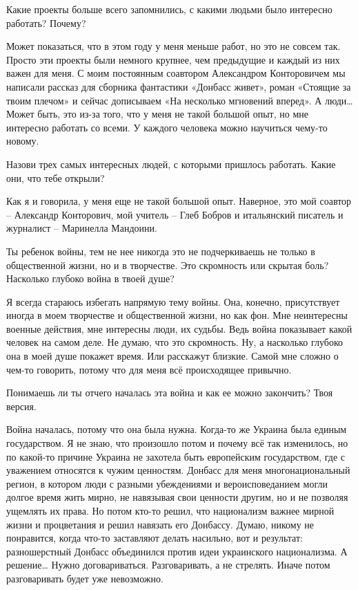 Какие проекты больше всего запомнились, с какими людьми было интересно
работать? Почему? 

Может показаться, что в этом году у меня меньше работ, но это не совсем так.
Просто эти проекты были немного крупнее, чем предыдущие и каждый из них важен
для меня. С моим постоянным соавтором Александром Конторовичем мы написали
рассказ для сборника фантастики «Донбасс живет», роман «Стоящие за твоим
плечом» и сейчас дописываем «На несколько мгновений вперед». А люди… Может
быть, это из-за того, что у меня не такой большой опыт, но мне интересно
работать со всеми. У каждого человека можно научиться чему-то новому.

Назови трех самых интересных людей, с которыми пришлось работать. Какие они,
что тебе открыли?

Как я и говорила, у меня еще не такой большой опыт. Наверное, это мой соавтор –
Александр Конторович, мой учитель – Глеб Бобров и итальянский писатель и
журналист – Маринелла Мандоини.

Ты ребенок войны, тем не нее никогда это не подчеркиваешь не только в
общественной жизни, но и в творчестве. Это скромность или скрытая боль?
Насколько глубоко война в твоей душе?

Я всегда стараюсь избегать напрямую тему войны. Она, конечно, присутствует
иногда в моем творчестве и общественной жизни, но как фон. Мне неинтересны
военные действия, мне интересны люди, их судьбы. Ведь война показывает какой
человек на самом деле. Не думаю, что это скромность. Ну, а насколько глубоко
она в моей душе покажет время. Или расскажут близкие. Самой мне сложно о чем-то
говорить, потому что для меня всё происходящее привычно.

Понимаешь ли ты отчего началась эта война и как ее можно закончить? Твоя
версия.

Война началась, потому что она была нужна. Когда-то же Украина была единым
государством. Я не знаю, что произошло потом и почему всё так изменилось, но по
какой-то причине Украина не захотела быть европейским государством, где с
уважением относятся к чужим ценностям. Донбасс для меня многонациональный
регион, в котором люди с разными убеждениями и вероисповеданием могли долгое
время жить мирно, не навязывая свои ценности другим, но и не позволяя ущемлять
их права. Но потом кто-то решил, что национализм важнее мирной жизни и
процветания и решил навязать его Донбассу. Думаю, никому не понравится, когда
что-то заставляют делать насильно, вот и результат: разношерстный Донбасс
объединился против идеи украинского национализма. А решение… Нужно
договариваться. Разговаривать, а не стрелять. Иначе потом разговаривать будет
уже невозможно.

